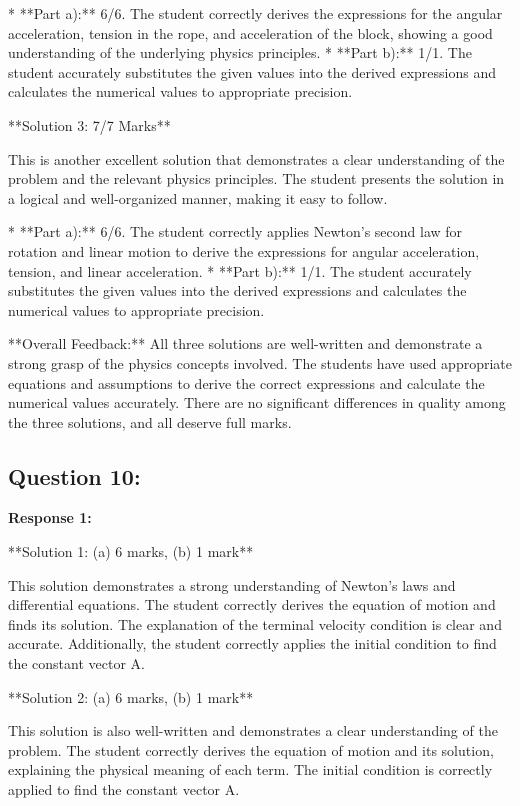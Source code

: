 \documentclass[a4paper,11pt]{article}
\begin{document}
*   **Part a):** 6/6. The student correctly derives the expressions for the angular acceleration, tension in the rope, and acceleration of the block, showing a good understanding of the underlying physics principles.
*   **Part b):** 1/1. The student accurately substitutes the given values into the derived expressions and calculates the numerical values to appropriate precision.

**Solution 3: 7/7 Marks**

This is another excellent solution that demonstrates a clear understanding of the problem and the relevant physics principles. The student presents the solution in a logical and well-organized manner, making it easy to follow.

*   **Part a):** 6/6. The student correctly applies Newton's second law for rotation and linear motion to derive the expressions for angular acceleration, tension, and linear acceleration.
*   **Part b):** 1/1. The student accurately substitutes the given values into the derived expressions and calculates the numerical values to appropriate precision.

**Overall Feedback:**
All three solutions are well-written and demonstrate a strong grasp of the physics concepts involved. The students have used appropriate equations and assumptions to derive the correct expressions and calculate the numerical values accurately. There are no significant differences in quality among the three solutions, and all deserve full marks.

\subsection*{Question 10:}

\textbf{Response 1:}

**Solution 1: (a) 6 marks, (b) 1 mark**

This solution demonstrates a strong understanding of Newton's laws and differential equations. The student correctly derives the equation of motion and finds its solution. The explanation of the terminal velocity condition is clear and accurate. Additionally, the student correctly applies the initial condition to find the constant vector A.

**Solution 2: (a) 6 marks, (b) 1 mark**

This solution is also well-written and demonstrates a clear understanding of the problem. The student correctly derives the equation of motion and its solution, explaining the physical meaning of each term. The initial condition is correctly applied to find the constant vector A.
\end{document}
